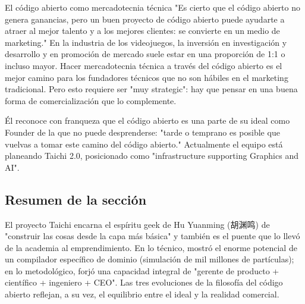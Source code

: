 \begin{importantbox}{El código abierto como mercadotecnia técnica}
"Es cierto que el código abierto no genera ganancias, pero un buen proyecto de código abierto puede ayudarte a atraer al mejor talento y a los mejores clientes: se convierte en un medio de marketing." En la industria de los videojuegos, la inversión en investigación y desarrollo y en promoción de mercado suele estar en una proporción de 1:1 o incluso mayor. Hacer mercadotecnia técnica a través del código abierto es el mejor camino para los fundadores técnicos que no son hábiles en el marketing tradicional. Pero esto requiere ser "muy strategic": hay que pensar en una buena forma de comercialización que lo complemente.
\end{importantbox}

Él reconoce con franqueza que el código abierto es una parte de su ideal como Founder de la que no puede desprenderse: "tarde o temprano es posible que vuelvas a tomar este camino del código abierto." Actualmente el equipo está planeando Taichi 2.0, posicionado como "infrastructure supporting Graphics and AI".

\subsection{Resumen de la sección}

El proyecto Taichi encarna el espíritu geek de Hu Yuanming (胡渊鸣) de "construir las cosas desde la capa más básica" y también es el puente que lo llevó de la academia al emprendimiento. En lo técnico, mostró el enorme potencial de un compilador específico de dominio (simulación de mil millones de partículas); en lo metodológico, forjó una capacidad integral de "gerente de producto + científico + ingeniero + CEO". Las tres evoluciones de la filosofía del código abierto reflejan, a su vez, el equilibrio entre el ideal y la realidad comercial.
